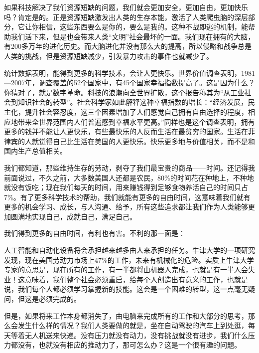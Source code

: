 如果科技解决了我们资源短缺的问题，我们就会更加安全，更加自由，更加快乐吗？肯定是的。正是资源短缺激发出人类的生存本能，激活了人类爬虫脑的深层部分，它让你相信，这些东西要么是你的，要么是我的。这种不战即逃的机制，能帮助我们活下来，但是也会带来人类“文明”社会最坏的一面。我们现在拥有的大脑，有200多万年的进化历史。而大脑进化并没有那么大的提高，所以侵略和战争总是人类的挑战，但是资源短缺减少，引发暴力攻击的事件也就减少了。

统计数据表明，能得到更多的科学技术，会让人更快乐。世界价值调查表明，1981—2007年，调查覆盖的52个国家中，有45个国家幸福指数提高了。这是因为什么？你猜对了，就是数字革命。科技的浪潮向全世界扩散，这个报告称其为“从工业社会到知识社会的转型”。社会科学家如此解释这种幸福指数的增长：“经济发展，民主化，提升社会容忍度，这三个因素增加了人们感觉自己拥有自由选择的程度，相应地带来全世界范围内人们普遍感到幸福水平更高。”同样也是这个调查表明，拥有更多的钱并不能让人更快乐，有些最快乐的人反而生活在最贫穷的国家。生活在菲律宾的人就觉得自己比生活在美国的人更快乐。快乐更多地与价值相关，而不是和国内生产总值相关。

我们都知道，那些维持生存的劳动，剥夺了我们最宝贵的商品——时间。还记得我前面说过，不久之前，大多数美国人还都是农民，80\%的时间花在种地上，不种地就没有饭吃；现在我们每天的时间，用来赚钱得到足够食物养活自己的时间只占7\%。有了更多科学技术的帮助，我们就能有更多的自由时间，这意味着我们就有更多的机会学习、成长，与人沟通、给予，所有这些追求都让我们作为人类能够更加圆满地实现自己，成就自己，满足自己。

我们得到更多的自由时间，有利也有害。不利的那一面是：

人工智能和自动化设备将会承担越来越多由人来承担的任务。牛津大学的一项研究发现，现在美国劳动力市场上47\%的工作，未来有机械化的危险。实质上牛津大学专家的意思是，现在所有的工作，有一半都将由机器人完成，也就是有一半人会失业！这意味着，我们整个社会必须重启，给每个人创造出有意义的工作，也就是说，我们每个人都必须学习掌握新的技能。这会是一个困难的转型，这一点毫无疑问，但这是必须完成的。

但是，如果将来工作本身都消失了，由电脑来完成所有的工作和大部分的思考，那么会发生什么样的情况？我们人类要做的就是，坐在自动驾驶的汽车上到处逛，每天等着无人机送来快递。没有压力就没有动力，没有挑战就没有进步，我们什么压力都没有，也就没有相应的推动力了，那可怎么办？这是一个很有趣的问题。

